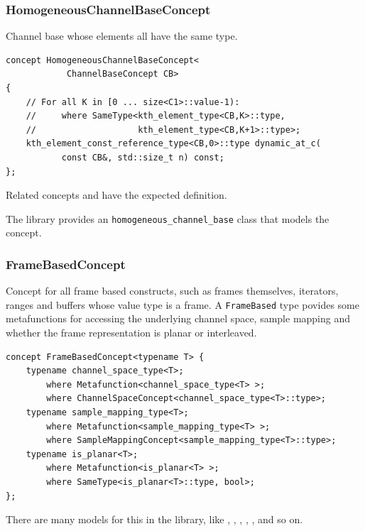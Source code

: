 \subsubsection{{HomogeneousChannelBaseConcept}}

Channel base whose elements all have the same type.

\begin{lstlisting}
concept HomogeneousChannelBaseConcept<
            ChannelBaseConcept CB> 
{
    // For all K in [0 ... size<C1>::value-1):
    //     where SameType<kth_element_type<CB,K>::type,
    //                    kth_element_type<CB,K+1>::type>;    
    kth_element_const_reference_type<CB,0>::type dynamic_at_c(
           const CB&, std::size_t n) const;
};  
\end{lstlisting}

Related concepts  and
 have the expected
definition.

The library provides an \texttt{homogeneous\_channel\_base} class that
models the concept.

\subsubsection{{FrameBasedConcept}}

Concept for all frame based constructs, such as frames themselves,
iterators, ranges and buffers whose value type is a frame. A
\texttt{FrameBased} type povides some metafunctions for accessing the
underlying channel space, sample mapping and whether the frame
representation is planar or interleaved.
  
\begin{lstlisting}
concept FrameBasedConcept<typename T> {
    typename channel_space_type<T>;     
        where Metafunction<channel_space_type<T> >;
        where ChannelSpaceConcept<channel_space_type<T>::type>;
    typename sample_mapping_type<T>; 
        where Metafunction<sample_mapping_type<T> >;  
        where SampleMappingConcept<sample_mapping_type<T>::type>;
    typename is_planar<T>;
        where Metafunction<is_planar<T> >;
        where SameType<is_planar<T>::type, bool>;
};  
\end{lstlisting}

There are many models for this in the library, like ,
, , ,
,  and so on.

